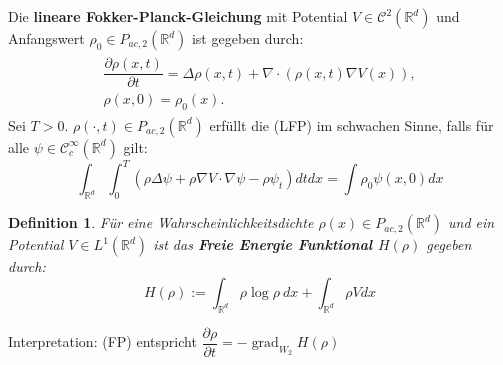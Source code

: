 \documentclass[11pt,a4paper,notitlepage]{scrreprt}
\newcommand{\RR}{\mathbb{R}}
\newcommand{\grad}{\operatorname{grad}}
\newtheorem{defi}{Definition}[section]
\begin{document}
Die \textbf{lineare Fokker-Planck-Gleichung}  mit Potential ${V\in \mathcal{C}^2(\RR^d)}$ und Anfangswert $\rho_0\in P_{ac,2}(\RR^d)$ ist gegeben durch:
\begin{align}\tag{FP}
\begin{split}
\dfrac{\partial\rho(x,t)}{\partial t}=\Delta\rho(x,t)+\nabla\cdot(\rho(x,t)\nabla V(x)),\\
\rho(x,0)=\rho_0(x).\label{FP}
\end{split}
\end{align}
Sei $T>0$. $\rho(\cdot,t)\in P_{ac,2}(\RR^d)$ erfüllt die (LFP) im schwachen Sinne, falls für alle $\psi\in \mathcal{C}_c^\infty(\RR^d)$ gilt:
\begin{equation}
\int_{\RR^d} \int_0^T (\rho\Delta\psi+\rho\nabla V\cdot\nabla\psi -\rho\psi_t) dt dx=\int\rho_0\psi(x,0)dx \label{FPweak}
\end{equation}

\vspace{10pt}

\begin{defi}
Für eine Wahrscheinlichkeitsdichte $\rho(x)\in P_{ac,2}(\RR^d)$ und ein Potential $V\in L^1(\RR^d)$ ist das \textbf{Freie Energie Funktional $H(\rho)$} gegeben durch:
\begin{equation}
H(\rho):=\int_{\RR^d} \rho\log\rho~ dx + \int_{\RR^d}\rho V dx \label{FEFktn}
\end{equation}
\end{defi}
\vspace{10pt}
Interpretation: (FP) entspricht $\dfrac{\partial\rho}{\partial t} = -\grad_{W_2} H(\rho)$
\end{document}
